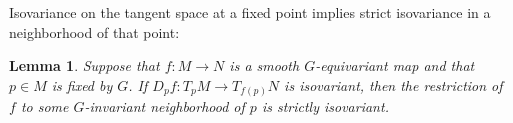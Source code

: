 \documentclass[11pt]{amsart}
\newtheorem{lem}{Lemma}[section]
\theoremstyle{definition}
\numberwithin{equation}{section}
\numberwithin{figure}{section}
\begin{document}





Isovariance on the tangent space at a fixed point implies strict isovariance in a neighborhood of that point:
\begin{lem}\label{isonbhdG}
Suppose that $f\colon M\to N$ is a smooth $G$-equivariant map and that $p\in M$ is fixed by $G$. If  $D_pf\colon T_pM\to T_{f(p)}N$ is isovariant, then the restriction of $f$ to some $G$-invariant neighborhood of $p$ is strictly isovariant.

\end{lem}
\end{document}
